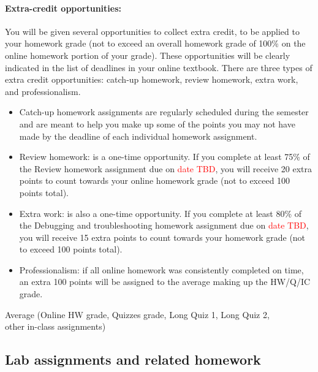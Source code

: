 \documentclass[12pt]{scrartcl}
\newcommand{\change}[2]{#2}
\begin{document}
\paragraph{Extra-credit opportunities:} 
You will be given several opportunities to collect extra credit, to be applied to your homework grade (not to exceed an overall homework grade of 100\% on the online homework portion of your grade). 
These opportunities will be clearly indicated in the list of deadlines in your online textbook. 
There are three types of extra credit opportunities: catch-up homework, review homework, extra work, and professionalism.
\begin{itemize}
\item Catch-up homework assignments are regularly scheduled during the semester and are meant to help you make up some of the points you may not have made by the deadline of each individual homework assignment. 
\item Review homework: is a one-time opportunity. If you complete at least 75\% of the Review homework assignment due on \change{March 6th}{\textcolor{red}{date TBD}}, you will receive 20 extra points to count towards your online homework grade (not to exceed 100 points total).
\item Extra work: is also a one-time opportunity. If you complete at least 80\% of the Debugging and troubleshooting homework assignment due on \change{February 15th}{\textcolor{red}{date TBD}}, you will receive 15 extra points to count towards your homework grade (not to exceed 100 points total).
\item Professionalism: if all online homework was consistently completed on time, an extra 100 points will be assigned to the average making up the HW/Q/IC grade.
\end{itemize}

\begin{tcolorbox}[colback=blue!5,colframe=blue!75!black,title=HW / Quizzes / In-Class Assignments Grade (HW/Q/IC)]
\begin{center}
Average (Online HW grade, Quizzes grade, Long Quiz 1, Long Quiz 2, \\ other in-class assignments)\\
\end{center}
\end{tcolorbox}

\subsection{Lab assignments and related homework}
\end{document}
